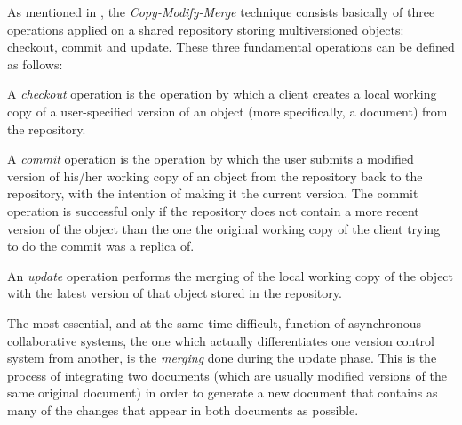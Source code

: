 As mentioned in \cite{ignat04b}, the \emph{Copy-Modify-Merge} technique consists basically
of three operations applied on a shared repository storing multiversioned objects: checkout,
commit and update. These three fundamental operations can be defined as follows:

\begin{defi}
A \emph{checkout} operation is the operation by which a client creates a local working copy
of a user-specified version of an object (more specifically, a document) from the repository.
\end{defi}

\begin{defi}
\label{def:commit}
A \emph{commit} operation is the operation by which the user submits a modified version of
his/her working copy of an object from the repository back to the repository, with the intention
of making it the current version. The commit operation is successful only if the repository
does not contain a more recent version of the object than the one the original working copy
of the client trying to do the commit was a replica of.
\end{defi}

\begin{defi}
An \emph{update} operation performs the merging of the local working copy of the object with
the latest version of that object stored in the repository.
\end{defi}

The most essential, and at the same time difficult, function of asynchronous collaborative systems,
the one which actually differentiates one version control system from another, is the
\emph{merging} done during the update phase. This is the process of integrating two documents
(which are usually modified versions of the same original document) in order to generate a
new document that contains as many of the changes that appear in both documents as possible.

